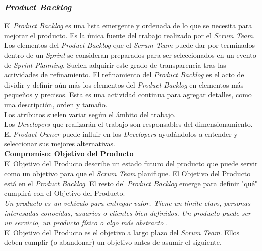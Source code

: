 \begin{spacing}{1.5}
		\subsubsection{\textit{Product Backlog}}
			El \textit{Product Backlog} es una lista emergente y ordenada de lo que se necesita para mejorar el producto. Es la única fuente del trabajo realizado por el \textit{Scrum Team}.
			Los elementos del \textit{Product Backlog} que el \textit{Scrum Team} puede dar por terminados dentro de un \textit{Sprint} se consideran preparados para ser seleccionados en un evento de \textit{Sprint Planning}. Suelen adquirir este grado de transparencia tras las actividades de refinamiento. El refinamiento del \textit{Product Backlog} es el acto de dividir y definir aún más los elementos del \textit{Product Backlog} en elementos más pequeños y precisos. Esta es una actividad continua para agregar detalles, como una descripción, orden y tamaño.\\
			Los atributos suelen variar según el ámbito del trabajo.\\
			Los \textit{Developers} que realizarán el trabajo son responsables del dimensionamiento. El \textit{Product Owner} puede influir en los \textit{Developers} ayudándolos a entender y seleccionar sus mejores alternativas.\\
			
			\textbf{Compromiso: Objetivo del Producto}\\
			El Objetivo del Producto describe un estado futuro del producto que puede servir como un objetivo para que el \textit{Scrum Team} planifique. El Objetivo del Producto está en el \textit{Product Backlog}. El resto del \textit{Product Backlog }emerge para definir "qué" cumplirá con el Objetivo del Producto.\\
			
			\textit{Un producto es un vehículo para entregar valor. Tiene un límite claro, personas interesadas
			conocidas, usuarios o clientes bien definidos. Un producto puede ser un servicio, un producto
			físico o algo más abstracto} \cite{chap2_scrum}.\\
		
			El Objetivo del Producto es el objetivo a largo plazo del \textit{Scrum Team}. Ellos deben cumplir (o abandonar) un objetivo antes de asumir el siguiente.

\end{spacing}
